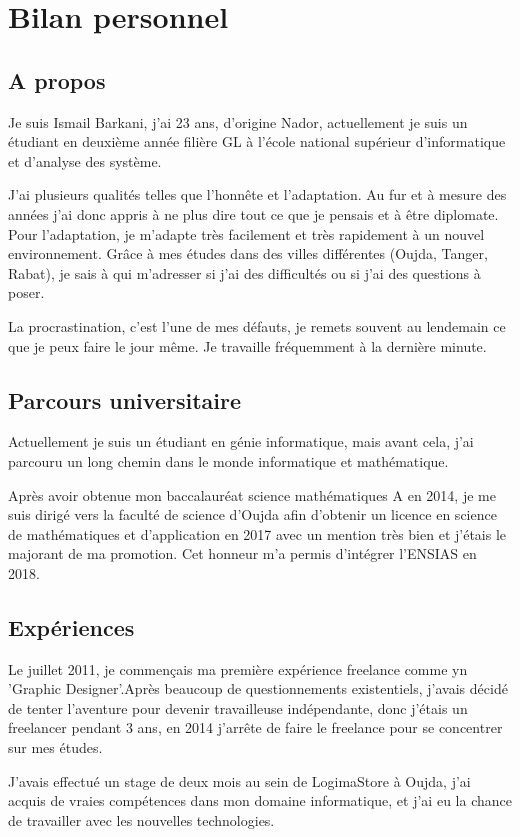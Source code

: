 \documentclass[a4paper, 12pt,french,oneside]{book}%
\theoremstyle{definition}
\theoremstyle{remark}
\begin{document}
\restoregeometry
\dominitoc%
\setcounter{tocdepth}{7}
\tableofcontents
\thispagestyle{empty}
\chapter{Bilan personnel}
\section{A propos }
Je suis Ismail Barkani, j'ai 23 ans, d'origine Nador, actuellement je suis un étudiant en deuxième année filière GL à l'école national supérieur d'informatique et d'analyse des système.

J'ai plusieurs qualités telles que l'honnête et l'adaptation. Au fur et à mesure des années j’ai donc appris à ne plus dire tout ce que je pensais et à être diplomate. Pour l'adaptation, je m'adapte très facilement et très rapidement à un nouvel environnement. Grâce à mes études dans des villes différentes (Oujda, Tanger, Rabat), je sais à qui m'adresser si j'ai des difficultés ou si j'ai des questions à poser.

La procrastination, c'est l'une de mes défauts, je remets souvent au lendemain ce que je peux faire le jour même. Je travaille fréquemment à la dernière minute.
\section{Parcours universitaire}
Actuellement je suis un étudiant en génie informatique, mais avant cela, j'ai parcouru un long chemin dans le monde informatique et mathématique.

Après avoir obtenue mon baccalauréat science mathématiques A en 2014, je me suis dirigé vers la faculté de science d'Oujda afin d'obtenir un licence en science de mathématiques et d'application en 2017 avec un mention très bien et j'étais le majorant de ma promotion. Cet honneur m'a permis d'intégrer l'ENSIAS en 2018.
\section{Expériences}
Le juillet 2011, je commençais ma première expérience freelance comme yn 'Graphic Designer'.Après beaucoup de questionnements existentiels, j’avais décidé de tenter l’aventure pour devenir travailleuse indépendante, donc j'étais un freelancer pendant 3 ans, en 2014 j'arrête de faire le freelance pour se concentrer sur mes études.

J'avais effectué un stage de deux mois au sein de LogimaStore à Oujda, j’ai acquis de vraies compétences dans mon domaine informatique, et j'ai eu la chance de travailler avec les nouvelles technologies.
\end{document}

